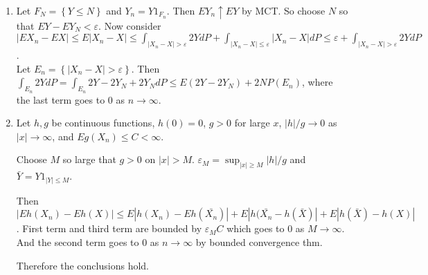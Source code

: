 \begin{problem}[2.3.5] \hfill
	\begin{enumerate}[label = (\alph*)]
		\item Let $F_N = \left\{ Y \leq N \right\}$ and $Y_n = Y 1_{F_n}$. Then $EY_n \uparrow EY$ by MCT. So choose $N$ so that $EY - EY_N < \varepsilon$.
			Now consider $\left | EX_n - EX \right | \leq E|X_n -X| \leq \int_{|X_n -X | > \varepsilon} 2Y dP + \int_{|X_n -X| \leq \varepsilon}|X_n - X| dP \leq \varepsilon + \int_{|X_n -X| > \varepsilon} 2Y dP$. \\

			Let $E_n = \left\{ |X_n - X| > \varepsilon \right\}$. Then $\int_{E_n} 2Y dP = \int_{E_n}2Y - 2Y_N + 2Y_N dP \leq E(2Y-2Y_N) + 2N P(E_n)$, where the last term goes to $0$ as $n \rightarrow \infty$.

		\item Let $h, g$ be continuous functions, $h(0) = 0$, $g>0$ for large $x$, $|h|/g \rightarrow 0$ as $|x| \rightarrow \infty$, and $Eg(X_n) \leq C <\infty$.

			Choose $M$ so large that $g>0$ on $|x| > M$. $\varepsilon_M = \sup_{|x| \geq M} |h|/g$ and $\bar{Y} = Y 1_{|Y| \leq M}$.

			Then $|Eh(X_n) - Eh(X)| \leq E|h(X_n) - Eh(\bar{X_n})| + E|h(\bar{X_n} - h(\bar{X})| + E|h(\bar{X}) - h(X)|$.
			First term and third term are bounded by $\varepsilon_M C$ which goes to $0$ as $M \rightarrow \infty$.
			And the second term goes to $0$ as $n\rightarrow \infty$ by bounded convergence thm.

			Therefore the conclusions hold.
	\end{enumerate}

\end{problem}

